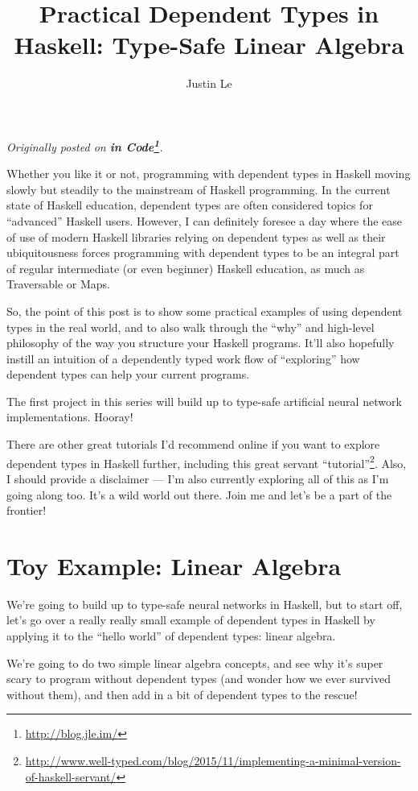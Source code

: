 \documentclass[]{article}
\title{Practical Dependent Types in Haskell: Type-Safe Linear Algebra}
\author{Justin Le}
\renewcommand{\href}[2]{#2\footnote{\url{#1}}}
\begin{document}
\maketitle

\emph{Originally posted on \textbf{\href{http://blog.jle.im/}{in
Code}}.}

Whether you like it or not, programming with dependent types in Haskell
moving slowly but steadily to the mainstream of Haskell programming. In
the current state of Haskell education, dependent types are often
considered topics for ``advanced'' Haskell users. However, I can
definitely foresee a day where the ease of use of modern Haskell
libraries relying on dependent types as well as their ubiquitousness
forces programming with dependent types to be an integral part of
regular intermediate (or even beginner) Haskell education, as much as
Traversable or Maps.

So, the point of this post is to show some practical examples of using
dependent types in the real world, and to also walk through the ``why''
and high-level philosophy of the way you structure your Haskell
programs. It'll also hopefully instill an intuition of a dependently
typed work flow of ``exploring'' how dependent types can help your
current programs.

The first project in this series will build up to type-safe artificial
neural network implementations. Hooray!

There are other great tutorials I'd recommend online if you want to
explore dependent types in Haskell further, including
\href{http://www.well-typed.com/blog/2015/11/implementing-a-minimal-version-of-haskell-servant/}{this
great servant ``tutorial''}. Also, I should provide a disclaimer --- I'm
also currently exploring all of this as I'm going along too. It's a wild
world out there. Join me and let's be a part of the frontier!

\section{Toy Example: Linear Algebra}\label{toy-example-linear-algebra}

We're going to build up to type-safe neural networks in Haskell, but to
start off, let's go over a really really small example of dependent
types in Haskell by applying it to the ``hello world'' of dependent
types: linear algebra.

We're going to do two simple linear algebra concepts, and see why it's
super scary to program without dependent types (and wonder how we ever
survived without them), and then add in a bit of dependent types to the
rescue!
\end{document}
